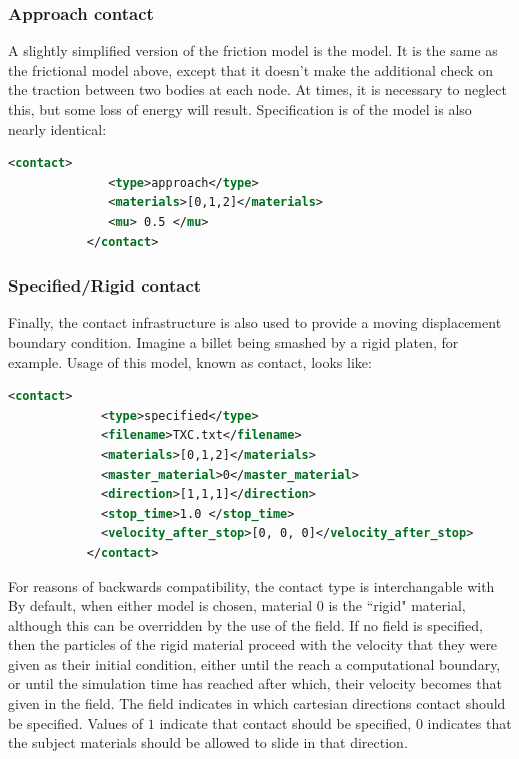 \subsubsection{Approach contact}
A slightly simplified version of the friction model is the
 model.  It is the same as the frictional model
above, except that it doesn't make the additional check on the traction
between two bodies at each node.  At times, it is necessary to neglect this,
but some loss of energy will result.  Specification is of the model is 
also nearly identical:

\begin{lstlisting}[language=XML]
           <contact>
              <type>approach</type>
              <materials>[0,1,2]</materials>
              <mu> 0.5 </mu>
           </contact>
\end{lstlisting}

\subsubsection{Specified/Rigid contact}
Finally, the contact infrastructure is also used to provide a moving
displacement boundary condition.  Imagine a billet being smashed by a
rigid platen, for example.  Usage of this model, known as
 contact, looks like:

\begin{lstlisting}[language=XML]
           <contact>
             <type>specified</type>
             <filename>TXC.txt</filename>
             <materials>[0,1,2]</materials>
             <master_material>0</master_material>
             <direction>[1,1,1]</direction>
             <stop_time>1.0 </stop_time>
             <velocity_after_stop>[0, 0, 0]</velocity_after_stop>
           </contact>
\end{lstlisting}
For reasons of backwards compatibility, the
 contact type is interchangable with
  By default, when either model is
chosen, material 0 is the ``rigid" material, although this can be
overridden by the use of the
 field.  If no
 field is specified, then the particles of the
rigid material proceed with the velocity that they were given as their
initial condition, either until the reach a computational boundary, or
until the simulation time has reached  after
which, their velocity becomes that given in the
 field.  The 
field indicates in which cartesian directions contact should be specified.
Values of $1$ indicate that contact should be specified, $0$ indicates that
the subject materials should be allowed to slide in that direction.  

